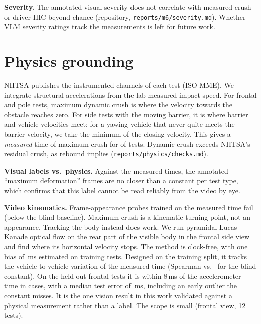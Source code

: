 \documentclass[10pt,twocolumn]{article}
\begin{document}
\begin{table}[t]\centering\small
\caption{VLM report quality on test clips. Fire hallucination: share of reports claiming fire or
a leak (none occurs in any clip). Contradicting claims: reported events that the labels mark as
absent.}\label{tab:vlm}
\resizebox{\columnwidth}{!}{}
\end{table}

\textbf{Severity.} The annotated visual severity does not correlate with measured crush or driver
HIC beyond chance (repository, \texttt{reports/m6/severity.md}). Whether VLM severity ratings
track the measurements is left for future work.

\section{Physics grounding}
NHTSA publishes the instrumented channels of each test (ISO-MME). We integrate structural
accelerations from the lab-measured impact speed. For frontal and pole tests, maximum dynamic
crush is where the velocity towards the obstacle reaches zero. For side tests with the moving
barrier, it is where barrier and vehicle velocities meet; for a yawing vehicle that never quite
meets the barrier velocity, we take the minimum of the closing velocity. This gives a
\emph{measured} time of maximum crush for \NPhysics{} of \NTests{} tests. Dynamic crush exceeds
NHTSA's residual crush, as rebound implies (\texttt{reports/physics/checks.md}).

\textbf{Visual labels vs.\ physics.} Against the measured times, the annotated
``maximum deformation'' frames are no closer than a constant per test type, which confirms that
this label cannot be read reliably from the video by eye.

\textbf{Video kinematics.} Frame-appearance probes trained on the measured time fail (below the
blind baseline). Maximum crush is a kinematic turning point, not an appearance. Tracking the
body instead does work. We run pyramidal Lucas--Kanade optical flow on the rear part of the
visible body in the frontal side view and find where its horizontal velocity stops. The method
is clock-free, with one bias of \FlowBias{}\,ms estimated on training tests. Designed on the
training split, it tracks the vehicle-to-vehicle variation of the measured time (Spearman
\FlowTrainRho{} vs.\ \BlindTrainRho{} for the blind constant). On the \NFlowHeldOut{} held-out
frontal tests it is within 8\,ms of the accelerometer time in \FlowHeldOutWithinEight{} cases,
with a median test error of \FlowTestMedErr{}\,ms, including an early outlier the constant
misses. It is the one vision result in this work validated against a physical measurement
rather than a label. The scope is small (frontal view, 12 tests).
\end{document}
